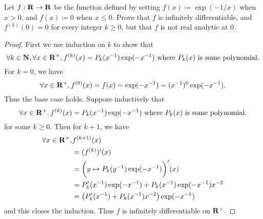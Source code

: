 \begin{exercise}\label{ex 4.5.4}
    Let \(f : \mathbf{R} \to \mathbf{R}\) be the function defined by setting \(f(x) \coloneqq \exp(-1 / x)\) when \(x > 0\), and \(f(x) \coloneqq 0\) when \(x \leq 0\).
    Prove that \(f\) is infinitely differentiable, and \(f^{(k)}(0) = 0\) for every integer \(k \geq 0\), but that \(f\) is not real analytic at \(0\).
\end{exercise}

\begin{proof}
    First we use induction on \(k\) to show that
    \[
        \forall k \in \mathbf{N}, \forall x \in \mathbf{R}^+, f^{(k)}(x) = P_k(x^{-1}) \exp(-x^{-1}) \text{ where } P_k(x) \text{ is some polynomial}.
    \]
    For \(k = 0\), we have
    \[
        \forall x \in \mathbf{R}^+, f^{(0)}(x) = f(x) = \exp(-x^{-1}) = (x^{-1})^0 \exp(-x^{-1}).
    \]
    Thus the base case holds.
    Suppose inductively that
    \[
        \forall x \in \mathbf{R}^+, f^{(k)}(x) = P_k(x^{-1}) \exp(-x^{-1}) \text{ where } P_k(x) \text{ is some polynomial}.
    \]
    for some \(k \geq 0\).
    Then for \(k + 1\), we have
    \begin{align*}
        \forall x \in \mathbf{R}^+, & f^{(k + 1)}(x)                                                  \\
                            & = (f^{(k)})'(x)                                                 \\
                            & = \bigg(y \mapsto P_k(y^{-1}) \exp(-x^{-1})\bigg)'(x)           \\
                            & = P_k'(x^{-1}) \exp(-x^{-1}) + P_k(x^{-1}) \exp(-x^{-1}) x^{-2} \\
                            & = \big(P_k'(x^{-1}) + P_k(x^{-1}) x^{-2}\big) \exp(-x^{-1})
    \end{align*}
    and this closes the induction.
    Thus \(f\) is infinitely differentiable on \(\mathbf{R}^+\).


\end{proof}
